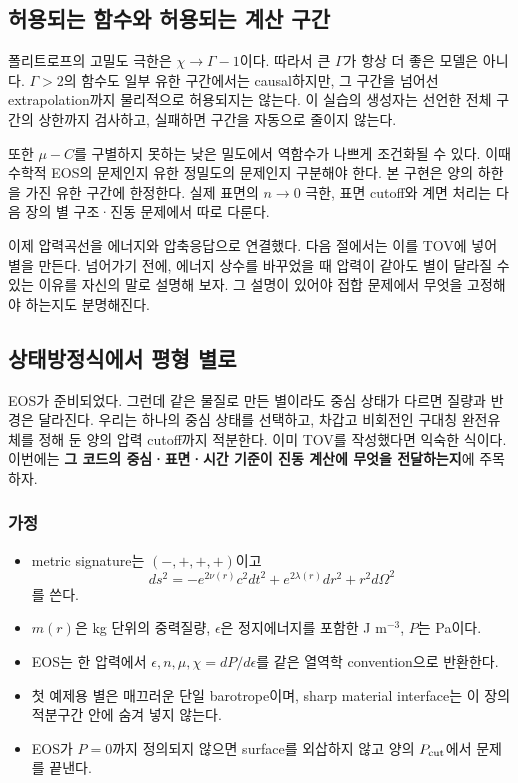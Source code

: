 \documentclass[
  10pt,
  a4paper,
]{article}
\providecommand{\tightlist}{%
  \setlength{\itemsep}{0pt}\setlength{\parskip}{0pt}}
\begin{document}
\subsection{허용되는 함수와 허용되는 계산
구간}\label{uxd5c8uxc6a9uxb418uxb294-uxd568uxc218uxc640-uxd5c8uxc6a9uxb418uxb294-uxacc4uxc0b0-uxad6cuxac04}

폴리트로프의 고밀도 극한은 \(\chi\to\Gamma-1\)이다. 따라서 큰
\(\Gamma\)가 항상 더 좋은 모델은 아니다. \(\Gamma>2\)의 함수도 일부 유한
구간에서는 causal하지만, 그 구간을 넘어선 extrapolation까지 물리적으로
허용되지는 않는다. 이 실습의 생성자는 선언한 전체 구간의 상한까지
검사하고, 실패하면 구간을 자동으로 줄이지 않는다.

또한 \(\mu-C\)를 구별하지 못하는 낮은 밀도에서 역함수가 나쁘게 조건화될
수 있다. 이때 수학적 EOS의 문제인지 유한 정밀도의 문제인지 구분해야
한다. 본 구현은 양의 하한을 가진 유한 구간에 한정한다. 실제 표면의
\(n\to0\) 극한, 표면 cutoff와 계면 처리는 다음 장의 별 구조·진동
문제에서 따로 다룬다.

이제 압력곡선을 에너지와 압축응답으로 연결했다. 다음 절에서는 이를 TOV에
넣어 별을 만든다. 넘어가기 전에, 에너지 상수를 바꾸었을 때 압력이 같아도
별이 달라질 수 있는 이유를 자신의 말로 설명해 보자. 그 설명이 있어야
접합 문제에서 무엇을 고정해야 하는지도 분명해진다.

\subsection{상태방정식에서 평형
별로}\label{uxc0c1uxd0dcuxbc29uxc815uxc2dduxc5d0uxc11c-uxd3c9uxd615-uxbcc4uxb85c}

EOS가 준비되었다. 그런데 같은 물질로 만든 별이라도 중심 상태가 다르면
질량과 반경은 달라진다. 우리는 하나의 중심 상태를 선택하고, 차갑고
비회전인 구대칭 완전유체를 정해 둔 양의 압력 cutoff까지 적분한다. 이미
TOV를 작성했다면 익숙한 식이다. 이번에는 \textbf{그 코드의
중심·표면·시간 기준이 진동 계산에 무엇을 전달하는지}에 주목하자.

\subsubsection{가정}\label{uxac00uxc815}

\begin{itemize}
\tightlist
\item
  metric signature는 \((-,+,+,+)\)이고 \[
  ds^2=-e^{2\nu(r)}c^2dt^2+e^{2\lambda(r)}dr^2+r^2d\Omega^2
  \] 를 쓴다.
\item
  \(m(r)\)은 kg 단위의 중력질량, \(\epsilon\)은 정지에너지를 포함한 J
  m\(^{-3}\), \(P\)는 Pa이다.
\item
  EOS는 한 압력에서 \(\epsilon,n,\mu,\chi=dP/d\epsilon\)를 같은 열역학
  convention으로 반환한다.
\item
  첫 예제용 별은 매끄러운 단일 barotrope이며, sharp material interface는
  이 장의 적분구간 안에 숨겨 넣지 않는다.
\item
  EOS가 \(P=0\)까지 정의되지 않으면 surface를 외삽하지 않고 양의
  \(P_{\rm cut}\)에서 문제를 끝낸다.
\end{itemize}
\end{document}

